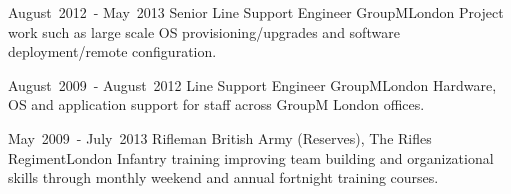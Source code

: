 
\cventry %
  {\mbox{August 2012 -} \mbox{May 2013}}
  {Senior  Line Support Engineer}
  {GroupM}{London}{}
  {
    Project work such as large scale OS provisioning/upgrades and software 
    deployment/remote configuration.\\
  }

\cventry %
  {\mbox{August 2009 -} \mbox{August 2012}}
  { Line Support Engineer}
  {GroupM}{London}{}
  {
    Hardware, OS and application support for staff across GroupM London offices.\\
  }

\cventry %
  {\mbox{May 2009 -} \mbox{July 2013}}
  {Rifleman}
  {British Army (Reserves), The Rifles Regiment}{London}{}
  {
    Infantry training improving team building and organizational skills through 
    monthly weekend and annual fortnight training courses.\\
  }

